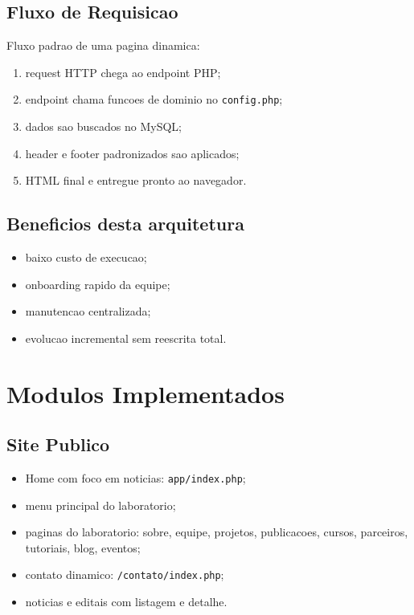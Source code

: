 \documentclass[12pt,a4paper]{article}
\begin{document}
\subsection{Fluxo de Requisicao}
Fluxo padrao de uma pagina dinamica:
\begin{enumerate}
\item request HTTP chega ao endpoint PHP;
\item endpoint chama funcoes de dominio no \texttt{config.php};
\item dados sao buscados no MySQL;
\item header e footer padronizados sao aplicados;
\item HTML final e entregue pronto ao navegador.
\end{enumerate}

\subsection{Beneficios desta arquitetura}
\begin{itemize}
\item baixo custo de execucao;
\item onboarding rapido da equipe;
\item manutencao centralizada;
\item evolucao incremental sem reescrita total.
\end{itemize}

\section{Modulos Implementados}
\subsection{Site Publico}
\begin{itemize}
\item Home com foco em noticias: \texttt{app/index.php};
\item menu principal do laboratorio;
\item paginas do laboratorio: sobre, equipe, projetos, publicacoes, cursos, parceiros, tutoriais, blog, eventos;
\item contato dinamico: \texttt{/contato/index.php};
\item noticias e editais com listagem e detalhe.
\end{itemize}
\end{document}
